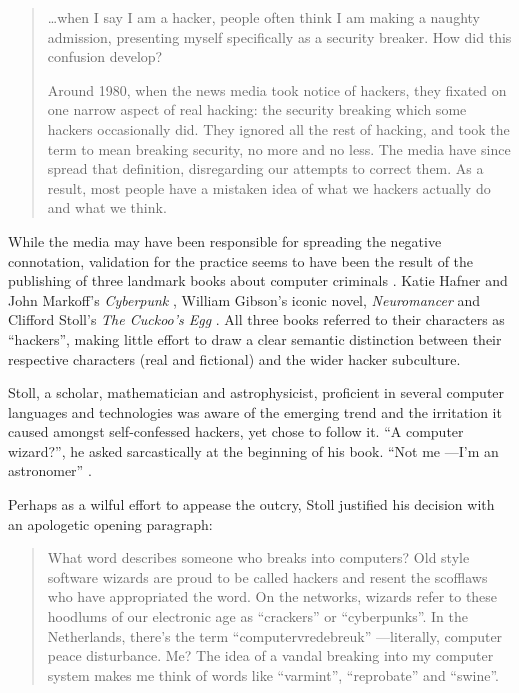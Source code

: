 \begin{quote}

\ldots when I say I am a hacker, people often think I am making a naughty admission, presenting myself specifically as a security breaker. How did this confusion develop?

Around 1980, when the news media took notice of hackers, they fixated on one narrow aspect of real hacking: the security breaking which some hackers occasionally did. They ignored all the rest of hacking, and took the term to mean breaking security, no more and no less. The media have since spread that definition, disregarding our attempts to correct them. As a result, most people have a mistaken idea of what we hackers actually do and what we think.

\end{quote}

While the media may have been responsible for spreading the negative connotation, validation for the practice seems to have been the result of the publishing of three landmark books about computer criminals \citep[p.xiii]{thomas02}. Katie Hafner and John Markoff's \textit{Cyberpunk} \citeyearpar{hafner91}, William Gibson's iconic novel, \textit{Neuromancer} \citeyearpar{gibson84} and Clifford Stoll's \textit{The Cuckoo's Egg} \citeyearpar{stoll89}. All three books referred to their characters as ``hackers'', making little effort to draw a clear semantic distinction between their respective characters (real and fictional) and the wider hacker subculture. 

Stoll, a scholar, mathematician and astrophysicist, proficient in several computer languages and technologies was aware of the emerging trend and the irritation it caused amongst self-confessed hackers, yet chose to follow it. ``A computer wizard?'', he asked sarcastically at the beginning of his book. ``Not me ---I'm an astronomer'' \citep[p. 1]{stoll89}.

Perhaps as a wilful effort to appease the outcry, Stoll justified his decision with an apologetic opening paragraph:

\begin{quote}
What word describes someone who breaks into computers? Old style software wizards are proud to be called hackers and resent the scofflaws who have appropriated the word. On the networks, wizards refer to these hoodlums of our electronic age as ``crackers'' or ``cyberpunks''. In the Netherlands, there's the term ``computervredebreuk'' ---literally, computer peace disturbance. Me? The idea of a vandal breaking into my computer system makes me think of words like ``varmint'', ``reprobate'' and ``swine''. \citep[p.11]{stoll89}
\end{quote}


